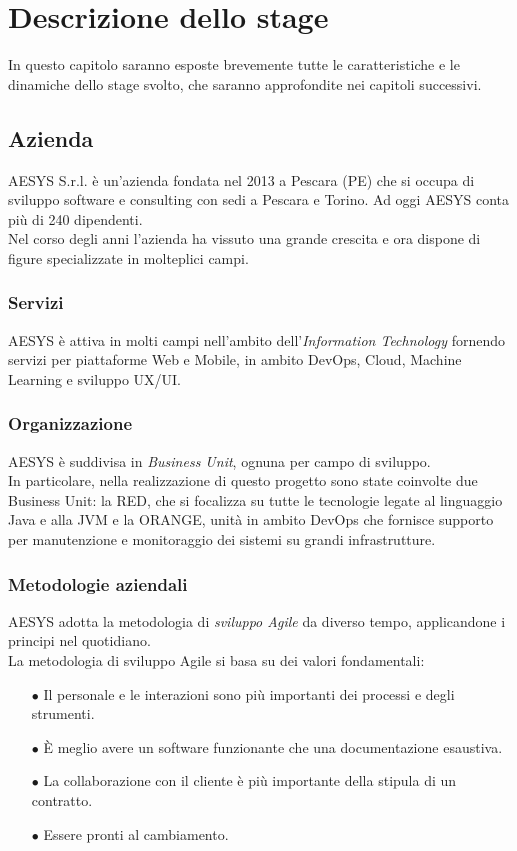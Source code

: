 \chapter{Descrizione dello stage}\label{chapter:descrizione}
In questo capitolo saranno esposte brevemente tutte le caratteristiche e le dinamiche dello stage svolto, che saranno approfondite nei capitoli successivi.

\section{Azienda}\label{sec:azienda}
AESYS S.r.l. è un'azienda fondata nel 2013 a Pescara (PE) che si occupa di sviluppo software e consulting con sedi a Pescara e Torino. Ad oggi AESYS conta più di 240 dipendenti.\\
Nel corso degli anni l'azienda ha vissuto una grande crescita e ora dispone di figure specializzate in molteplici campi. \cite{AESYS}\\

\subsection{Servizi}\label{sec:servizi}
AESYS è attiva in molti campi nell'ambito dell'\emph{Information Technology} fornendo servizi per piattaforme Web e Mobile, in ambito DevOps, Cloud, Machine Learning e sviluppo UX/UI.

\subsection{Organizzazione}\label{sec:organizzazione}
AESYS è suddivisa in \emph{Business Unit}, ognuna per campo di sviluppo.\\
In particolare, nella realizzazione di questo progetto sono state coinvolte due Business Unit: la RED, che si focalizza su tutte le tecnologie legate al linguaggio Java e alla JVM e la ORANGE, unità in ambito DevOps che fornisce supporto per manutenzione e monitoraggio dei sistemi su grandi infrastrutture.

\subsection{Metodologie aziendali}\label{sec:metodologieaziendali}
AESYS adotta la metodologia di \emph{sviluppo Agile} da diverso tempo, applicandone i principi nel quotidiano.\\
La metodologia di sviluppo Agile si basa su dei valori fondamentali:
\begin{itemize}
	\item[$\bullet$]Il personale e le interazioni sono più importanti dei processi e degli strumenti.
	\item[$\bullet$]È meglio avere un software funzionante che una documentazione esaustiva.
	\item[$\bullet$]La collaborazione con il cliente è più importante della stipula di un contratto.
	\item[$\bullet$]Essere pronti al cambiamento.
\end{itemize}

